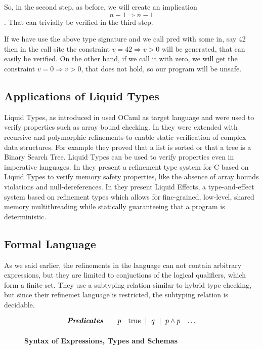 So, in the second step, as before, we will create an implication
$$n-1 \Rightarrow n - 1 $$. That can trivially be verified in the third step.

If we have use the above type signature and we call pred with some in, say 42
then in the call site the constraint $v = 42 \Rightarrow v >0$ will be generated, that can easily
be verified.
%
On the other hand, if we call it with zero, we will get the constraint
$v = 0 \Rightarrow v >0$, that does not hold, 
so our program will be unsafe.

\subsection{Applications of Liquid Types}

Liquid Types, as introduced in \cite{LiquidPLDI08} used OCaml as target language
and were used to verify properties such as array bound checking.
In \cite{LiquidPLDI09} they were extended with recursive and polymorphic refinements
to enable static verification of complex data structures. For example they proved
that a list is sorted or that a tree is a Binary Search Tree.
%
Liquid Types can be used to verify properties even in imperative languages.
In \cite{Rondon10} they present a refinement type system for
C based on Liquid Types to verify memory safety properties, 
like the absence of array bounds violations
and null-dereferences.
In \cite{Kawaguchi12}
they present Liquid Effects, a type-and-effect system based on refinement types
which allows for fine-grained, low-level, shared memory multithreading while statically guaranteeing that a program is deterministic. 

\subsection{Formal Language}

As we said earlier, the refinements in the language 
can not contain arbitrary expressions, but they are limited
to conjuctions of the logical qualifiers, which form a finite set.
They use a subtyping relation similar to 
hybrid type checking, but since their refinemet language is restricted, 
the subtyping relation is decidable.

\begin{figure}[t!]
\centering
$$
\begin{array}{rrcl}
\textbf{\emph{Predicates}} \quad 
  & p
  & 		\text{true}
  \ \mid \  q
  \ \mid \  p \land p
  & \dots
  \\[0.05in] 
\end{array}
$$
\caption{\textbf{Syntax of Expressions, Types and Schemas}}
\label{fig:syntax}
\end{figure}


